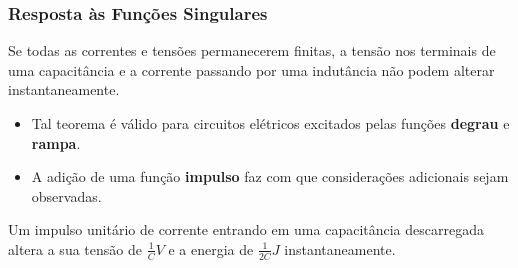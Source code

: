 \documentclass[mathserif]{beamer}
\begin{document}
\begin{frame}
\frametitle{Resposta às Funções Singulares}
	\begin{theorem}
		Se todas as correntes e tensões permanecerem finitas, a tensão nos terminais de uma capacitância e a corrente passando por uma indutância não podem alterar instantaneamente.
	\end{theorem}
	\begin{itemize}
		\item Tal teorema é válido para circuitos elétricos excitados pelas funções \textbf{degrau} e \textbf{rampa}.
		\item A adição de uma função \textbf{impulso} faz com que considerações adicionais sejam observadas.
	\end{itemize}
	\begin{theorem}
		Um impulso unitário de corrente entrando em uma capacitância descarregada altera a sua tensão de $\frac{1}{C}V$ e a energia de $\frac{1}{2C}J$ instantaneamente.
	\end{theorem}
\end{frame}
\end{document}
